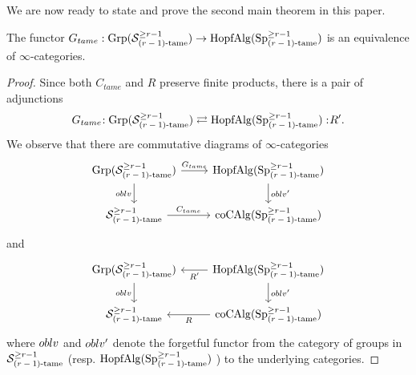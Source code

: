 We are now ready to state and prove the second main theorem in this paper.
\begin{theorem}
	The functor $G_{tame}: \operatorname{Grp}({\mathcal{S}}^{\geq r-1}_{\text{($r-1$)-tame}})\to \operatorname{HopfAlg}(\operatorname{Sp}^{\geq r-1}_{\text{($r-1$)-tame}})$ is an equivalence of $\infty$-categories.
\end{theorem}
\begin{proof}
Since both $C_{tame}$ and $R$ preserve finite products, there is a pair of adjunctions
\begin{equation}
\label{adj on grps}
	G_{tame}\negmedspace: \operatorname{Grp}({\mathcal{S}}^{\geq r-1}_{\text{($r-1$)-tame}})\rightleftarrows \operatorname{HopfAlg}(\operatorname{Sp}^{\geq r-1}_{\text{($r-1$)-tame}}):\negmedspace R'.
\end{equation}
We observe that there are commutative diagrams of $\infty$-categories
\[
\begin{tikzcd}
	\Grp(\CS^{\geq r-1}_{\text{($r-1$)-tame}}) & \Hopfalgebra(\Sp^{\geq r-1}_{\text{($r-1$)-tame}})\\
	\CS^{\geq r-1}_{\text{($r-1$)-tame}}  & 
	\coCAlg(\Sp^{\geq r-1}_{\text{($r-1$)-tame}})
	\arrow[from=1-1, to= 1-2, "G_{tame}"]
	\arrow[from=1-1, to=2-1, "\oblv" left]
	\arrow[from=1-2, to=2-2, "\oblv'" ]
	\arrow[from=2-1, to= 2-2, "C_{tame}"]
\end{tikzcd}
\]
and 
\[
\begin{tikzcd}
	\Grp(\CS^{\geq r-1}_{\text{($r-1$)-tame}}) & \Hopfalgebra(\Sp^{\geq r-1}_{\text{($r-1$)-tame}})\\
	\CS^{\geq r-1}_{\text{($r-1$)-tame}}  & 
	\coCAlg(\Sp^{\geq r-1}_{\text{($r-1$)-tame}})
	\arrow[from=1-2, to= 1-1, "R'"]
	\arrow[from=1-1, to=2-1, "\oblv" left]
	\arrow[from=1-2, to=2-2, "\oblv'" ]
	\arrow[from=2-2, to= 2-1, "R"]
\end{tikzcd}
\]
where $oblv$ and $oblv'$ denote the forgetful functor from the category of groups in ${\mathcal{S}}^{\geq r-1}_{\text{($r-1$)-tame}}$ (resp. $\operatorname{HopfAlg}(\operatorname{Sp}^{\geq r-1}_{\text{($r-1$)-tame}})$ ) to the underlying categories.


\end{proof}

